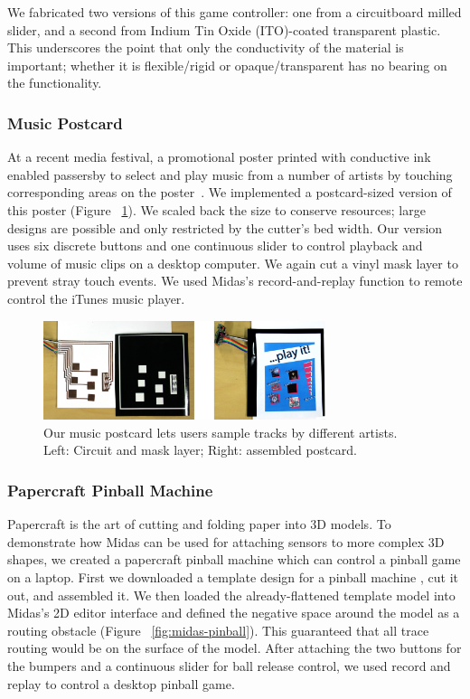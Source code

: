 We fabricated two versions of this game controller: one from a circuitboard milled slider, and a second from Indium Tin Oxide (ITO)-coated transparent plastic. This underscores the point that only the conductivity of the material is important; whether it is flexible/rigid or opaque/transparent has no bearing on the functionality.

        \subsubsection{Music Postcard}
At a recent media festival, a promotional poster printed with conductive ink enabled passersby to select and play music from a number of artists by touching corresponding areas on the poster~\cite{paperposter}. We implemented a postcard-sized version of this poster (Figure ~\ref{fig:midas-poster}).  We scaled back the size to conserve resources; large designs are possible and only restricted by the cutter's bed width. Our version uses six discrete buttons and one continuous slider to control playback and volume of music clips on a desktop computer. We again cut a vinyl mask layer to prevent stray touch events. We used Midas's record-and-replay function to remote control the iTunes music player.

\begin{figure}[t]
\centering
\includegraphics[width=3.25in]{figures/midas/poster3.jpg}
\caption{Our music postcard lets users sample tracks by different artists. Left: Circuit and mask layer; Right: assembled postcard.} 
\label{fig:midas-poster}
\end{figure}

        \subsubsection{Papercraft Pinball Machine}
Papercraft is the art of cutting and folding paper into 3D models. To demonstrate how Midas can be used for attaching sensors to more complex 3D shapes, 
we created a papercraft pinball machine which can control a pinball game on a laptop. First we downloaded a template design for a pinball machine \cite{indianajones}, cut it out, and assembled it.  We then loaded the already-flattened template model into Midas's 2D editor interface and defined the negative space around the model as a routing obstacle (Figure ~\ref{fig:midas-pinball}). This guaranteed that all trace routing would be on the surface of the model. After attaching the two buttons for the bumpers and a continuous slider for ball release control, we used record and replay to control a desktop pinball game.

